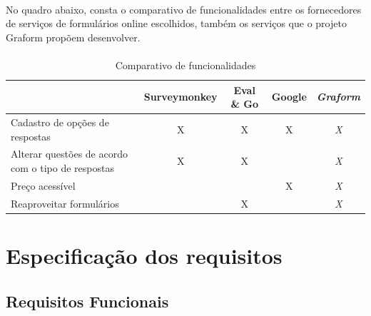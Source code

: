 \documentclass[11pt]{article}
\begin{document}
      \paragraph{}
      
      No quadro abaixo, consta o comparativo de funcionalidades entre os 
      fornecedores de serviços de formulários online escolhidos, também
      os serviços que o projeto Graform propõem desenvolver.

      \paragraph{}

      \begin{table}[h]
        \begin{center}
          \begin{tabular}{ | p{5cm} | c | c | c | c | }
            \hline
                                                                                & Surveymonkey\cellcolor{gray}  & Eval \& Go\cellcolor{gray} & Google\cellcolor{gray} & \em Graform\cellcolor{gray} \\
            \hline
            Cadastro de opções de respostas\cellcolor{gray}                     & X             & X           & X       & \em X \\
            \hline
            Alterar questões de acordo com o tipo de respostas\cellcolor{gray} & X             & X           &         & \em X \\
            \hline
            Preço acessível\cellcolor{gray}                                     &               &             & X       & \em X \\
            \hline
            Reaproveitar formulários\cellcolor{gray}                          &               & X           &         & \em X \\
            \hline
          \end{tabular}
          \caption{Comparativo de funcionalidades}
        \end{center}
      \end{table}
      
  \newpage

  \section{Especificação dos requisitos}
    
    \subsection{Requisitos Funcionais}
\end{document}
